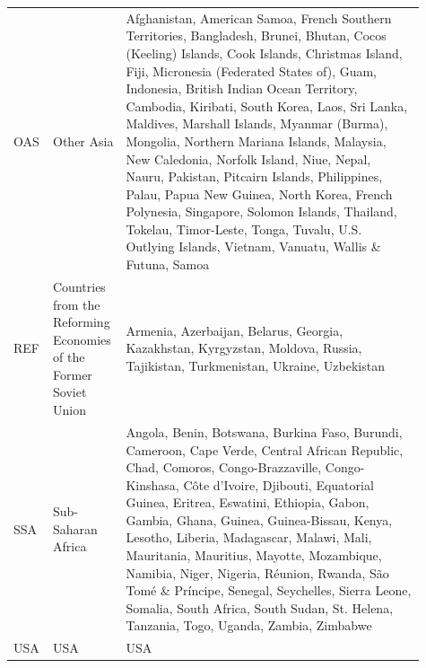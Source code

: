 \begin{longtable}{>{\raggedright\arraybackslash}p{0.06\linewidth}>{\raggedright\arraybackslash}p{0.15\linewidth}>{\raggedright\arraybackslash}p{0.7\linewidth}}
OAS & Other Asia & Afghanistan, American Samoa, French Southern Territories, Bangladesh, Brunei, Bhutan, Cocos (Keeling) Islands, Cook Islands, Christmas Island, Fiji, Micronesia (Federated States of), Guam, Indonesia, British Indian Ocean Territory, Cambodia, Kiribati, South Korea, Laos, Sri Lanka, Maldives, Marshall Islands, Myanmar (Burma), Mongolia, Northern Mariana Islands, Malaysia, New Caledonia, Norfolk Island, Niue, Nepal, Nauru, Pakistan, Pitcairn Islands, Philippines, Palau, Papua New Guinea, North Korea, French Polynesia, Singapore, Solomon Islands, Thailand, Tokelau, Timor-Leste, Tonga, Tuvalu, U.S. Outlying Islands, Vietnam, Vanuatu, Wallis \& Futuna, Samoa \\
REF & Countries from the Reforming Economies of the Former Soviet Union & Armenia, Azerbaijan, Belarus, Georgia, Kazakhstan, Kyrgyzstan, Moldova, Russia, Tajikistan, Turkmenistan, Ukraine, Uzbekistan \\
SSA & Sub-Saharan Africa & Angola, Benin, Botswana, Burkina Faso, Burundi, Cameroon, Cape Verde, Central African Republic, Chad, Comoros, Congo-Brazzaville, Congo-Kinshasa, Côte d'Ivoire, Djibouti, Equatorial Guinea, Eritrea, Eswatini, Ethiopia, Gabon, Gambia, Ghana, Guinea, Guinea-Bissau, Kenya, Lesotho, Liberia, Madagascar, Malawi, Mali, Mauritania, Mauritius, Mayotte, Mozambique, Namibia, Niger, Nigeria, Réunion, Rwanda, São Tomé \& Príncipe, Senegal, Seychelles, Sierra Leone, Somalia, South Africa, South Sudan, St. Helena, Tanzania, Togo, Uganda, Zambia, Zimbabwe \\
USA & USA & USA \\
\end{longtable}
